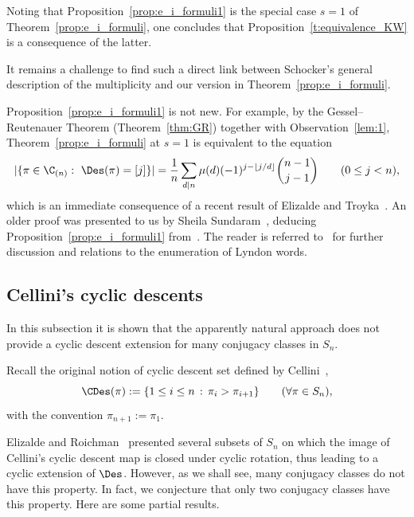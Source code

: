 \begin{remark}
    Noting that Proposition~\ref{prop:e_i_formuli1} is the special case $s=1$ of Theorem~\ref{prop:e_i_formuli}, one concludes that Proposition~\ref{t:equivalence_KW} is a consequence of the latter.
\end{remark}

It remains a challenge to find such a direct link between Schocker's general description of the multiplicity and our version in Theorem~\ref{prop:e_i_formuli}.

\begin{remark}\label{rem:ET}
    Proposition~\ref{prop:e_i_formuli1} 
    is not new.
    For example, by the Gessel--Reutenauer Theorem (Theorem~\ref{thm:GR}) together with Observation~\ref{lem:1}, 
    Theorem~\ref{prop:e_i_formuli} at $s=1$ is equivalent to the equation
    \[
        |\{\pi\in \C_{(n)}: \ \Des(\pi)=[j]\}|
        = \frac{1}{n} \sum_{d|n} \mu(d) (-1)^{j - \lfloor j/d \rfloor} \binom{n-1}{j-1}
        \qquad (0 \le j <n),        
    \]
    which is an immediate consequence of a recent result of Elizalde and Troyka~\cite[ Theorem 3.1]{ET}.  
    An older proof was presented to us by Sheila Sundaram~\cite{Sundaram_personal}, deducing 
    Proposition~\ref{prop:e_i_formuli1} 
    from~\cite[Lemma 2.7]{Sundaram_Adv}. 
    The reader is referred to~\cite{ET} for further discussion and relations to the enumeration of Lyndon words.  
\end{remark}


\subsection{Cellini's cyclic descents}\label{sec:Cellini}
	
In this subsection it is shown that the apparently natural approach does not provide a cyclic descent extension for many conjugacy classes in $S_n$.
	
Recall the original notion of cyclic descent set defined by Cellini~\cite{Cellini},
\[
	\CDes(\pi) 
	:= \{1 \leq i \leq n \,:\, \pi_i > \pi_{i+1} \}
    \qquad (\forall \pi \in S_n),
\]
with the convention $\pi_{n+1}:=\pi_1$.
	
Elizalde and Roichman~\cite{ER19} presented several subsets of $S_n$ on which the image of Cellini's cyclic descent map is closed under cyclic rotation, thus leading to a cyclic extension of $\Des$.
However, as we shall see, many conjugacy classes do not have this property. In fact, we conjecture that only two conjugacy classes have this property.
Here are some partial results.
	
